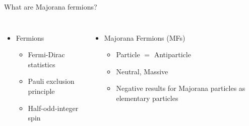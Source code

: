 \documentclass[xcolor=dvipsnames,10pt,aspectratio=169]{beamer}
\begin{document}
\begin{frame}{What are Majorana fermions?}
\begin{columns}
      \vspace{1em}

      \begin{itemize}
        \setlength\itemsep{0pt}
        \item Fermions
          \begin{itemize}
            \item Fermi-Dirac statistics
            \item Pauli exclusion principle
            \item Half-odd-integer spin
          \end{itemize}
      \end{itemize}

      \begin{itemize}
        \setlength\itemsep{0pt}
        \item Majorana Fermions (MFs)
        \begin{itemize}
            \item Particle $=$ Antiparticle
            \item Neutral, Massive
            \item Negative results for Majorana particles as elementary particles
        \end{itemize}
      \end{itemize}

    \end{columns}

  \end{frame}
\end{document}
